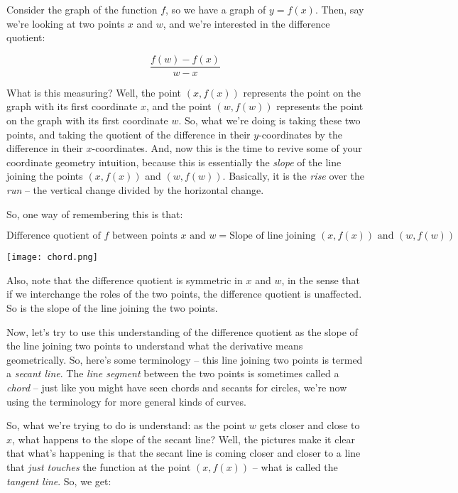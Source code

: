 \documentclass[10pt]{amsart}
\begin{document}
Consider the graph of the function $f$, so we have a graph of $y =
f(x)$. Then, say we're looking at two points $x$ and $w$, and we're
interested in the difference quotient:

$$\frac{f(w) - f(x)}{w - x}$$

What is this measuring? Well, the point $(x,f(x))$ represents the
point on the graph with its first coordinate $x$, and the point
$(w,f(w))$ represents the point on the graph with its first coordinate
$w$. So, what we're doing is taking these two points, and taking the
quotient of the difference in their $y$-coordinates by the difference
in their $x$-coordinates. And, now this is the time to revive some of
your coordinate geometry intuition, because this is essentially the
{\em slope} of the line joining the points $(x,f(x))$ and
$(w,f(w))$. Basically, it is the {\em rise} over the {\em run} -- the
vertical change divided by the horizontal change.

So, one way of remembering this is that:

\begin{equation*}
  \text{Difference quotient of $f$ between points $x$ and $w$} = \text{Slope of line joining $(x,f(x))$ and $(w,f(w))$}
\end{equation*}

\texttt{[image: chord.png]}

Also, note that the difference quotient is symmetric in $x$ and $w$,
in the sense that if we interchange the roles of the two points, the
difference quotient is unaffected. So is the slope of the line joining
the two points.

Now, let's try to use this understanding of the difference quotient as
the slope of the line joining two points to understand what the
derivative means geometrically. So, here's some terminology -- this
line joining two points is termed a {\em secant line}. The {\em line
segment} between the two points is sometimes called a {\em chord} --
just like you might have seen chords and secants for circles, we're
now using the terminology for more general kinds of curves.

So, what we're trying to do is understand: as the point $w$ gets
closer and close to $x$, what happens to the slope of the secant line?
Well, the pictures make it clear that what's happening is that the
secant line is coming closer and closer to a line that {\em just
touches} the function at the point $(x,f(x))$ -- what is called the
{\em tangent line}. So, we get:
\end{document}

